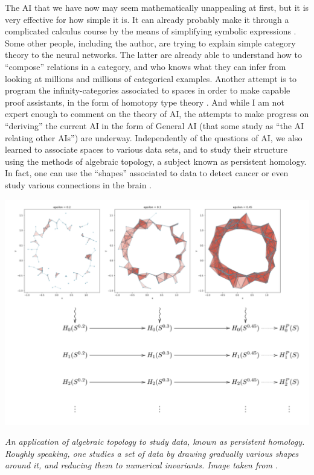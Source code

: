 \documentclass{article}
\begin{document}
The AI that we have now may seem mathematically unappealing at first, but it is very effective for how simple it is. It can already probably make it through a complicated calculus course by the means of simplifying symbolic expressions \cite{LAMPCHART}. Some other people, including the author, are trying to explain simple category theory to the neural networks. The latter are already able to understand how to ``compose'' relations
in a category, and who knows what they can infer from looking at millions and millions of categorical examples.
Another attempt is to program the infinity-categories associated to spaces in order to make capable proof assistants, in the form of homotopy type theory \cite{HOTT}. And while I am not expert enough to comment on the theory of AI, the attempts to make progress on “deriving” the current AI in the form of General AI (that some study as ``the AI relating other AIs'') are underway.
Independently of the questions of AI, we also learned to associate spaces to various data sets, and to study their structure
using the methods of algebraic topology, a subject known as persistent homology. In
fact, one can use the ``shapes'' associated to data to detect cancer \cite{LAWSON} or
even study various connections in the brain \cite{PETRI}.

\begin{center}
\includegraphics[scale=0.51]{noisy_circle_simplexes_and_persistent_homology.png}

\textit{An application of algebraic topology to study data, known as persistent homology. Roughly speaking, one studies a set of data by drawing gradually various shapes around it, and reducing them to numerical invariants. Image taken from \cite{BUNCH}}.
\end{center}
\end{document}
